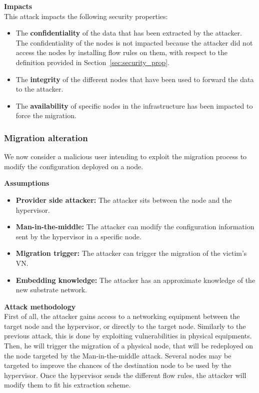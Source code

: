 \textbf{Impacts}\textbf{\\}
This attack impacts the following security properties:
\begin{itemize}
    \item The \textbf{confidentiality} of the data that has been extracted by the attacker.
The confidentiality of the nodes is not impacted because the attacker did not access the nodes by installing flow rules on them, with respect to the definition provided in Section~\ref{sec:security_prop}.

    \item The \textbf{integrity} of the different nodes that have been used to forward the data to the attacker.
    
    \item The \textbf{availability} of specific nodes in the infrastructure has been impacted to force the migration.
    
\end{itemize}

\subsubsection{Migration alteration}
We now consider a malicious user intending to exploit the migration process to modify the configuration deployed on a node.

\textbf{Assumptions}
\begin{itemize}
    \item \textbf{Provider side attacker:} The attacker sits between the node and the hypervisor.
    \item \textbf{Man-in-the-middle:} The attacker can modify the configuration information sent by the hypervisor in a specific node.
    \item \textbf{Migration trigger:} The attacker can trigger the migration of the victim's VN.
    \item \textbf{Embedding knowledge:} The attacker has an approximate knowledge of the new substrate network.
\end{itemize}

\textbf{Attack methodology}\textbf{\\}
First of all, the attacker gains access to a networking equipment between the target node and the hypervisor, or directly to the target node. Similarly to the previous attack, this is done by exploiting vulnerabilities in physical equipments.
Then, he will trigger the migration of a physical node, that will be redeployed on the node targeted by the Man-in-the-middle attack. Several nodes may be targeted to improve the chances of the destination node to be used by the hypervisor.
Once the hypervisor sends the different flow rules, the attacker will modify them to fit his extraction scheme.

